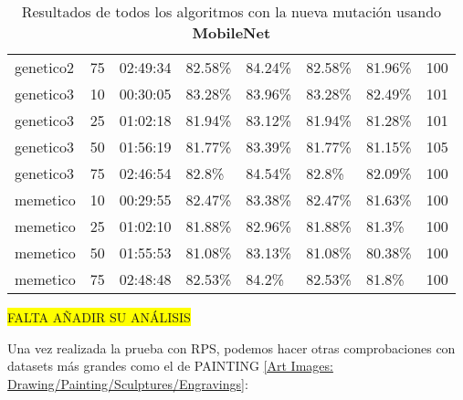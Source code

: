 \begin{table}[htp]
{\begin{tabular}{lp{2cm}lp{2cm}p{2cm}p{2cm}p{2cm}p{2.2cm}}
        genetico2 & 75 & 02:49:34 & 82.58\% & 84.24\% & 82.58\% & 81.96\% & 100 \\
        genetico3 & 10 & 00:30:05 & 83.28\% & 83.96\% & 83.28\% & 82.49\% & 101 \\
        genetico3 & 25 & 01:02:18 & 81.94\% & 83.12\% & 81.94\% & 81.28\% & 101 \\
        genetico3 & 50 & 01:56:19 & 81.77\% & 83.39\% & 81.77\% & 81.15\% & 105 \\
        genetico3 & 75 & 02:46:54 & 82.8\% & 84.54\% & 82.8\% & 82.09\% & 100 \\
        memetico & 10 & 00:29:55 & 82.47\% & 83.38\% & 82.47\% & 81.63\% & 100 \\
        memetico & 25 & 01:02:10 & 81.88\% & 82.96\% & 81.88\% & 81.3\% & 100 \\
        memetico & 50 & 01:55:53 & 81.08\% & 83.13\% & 81.08\% & 80.38\% & 100 \\
        memetico & 75 & 02:48:48 & 82.53\% & 84.2\% & 82.53\% & 81.8\% & 100 \\
        \bottomrule
        \end{tabular}
    }
    \caption{Resultados de todos los algoritmos con la nueva mutación usando \textbf{MobileNet}}
    \label{tab:generation-rps-with-new-mutation}
\end{table}

\colorbox{yellow}{FALTA AÑADIR SU ANÁLISIS}


Una vez realizada la prueba con RPS, podemos hacer otras comprobaciones con datasets más grandes como el de PAINTING
\hyperref[subsec:painting]{[Art Images: Drawing/Painting/Sculptures/Engravings]}:
\begin{table}[htp]
    \centering
    \caption{Resultados de todos los algoritmos para PAINTING con la nueva mutación usando \textbf{MobileNet}}
    \label{tab:generation-painting-with-new-mutation}
\end{table}

